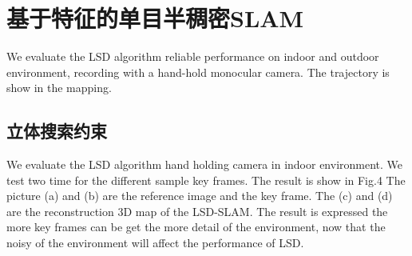 
\chapter{基于特征的单目半稠密SLAM}
\label{chap:Semi-Dense}
We evaluate the LSD algorithm reliable performance on indoor and outdoor environment, recording with a hand-hold monocular camera. The trajectory is show in the mapping.

\section{立体搜索约束}
We evaluate the LSD algorithm hand holding camera in indoor environment. We test two time for the different sample key frames. The result is show in Fig.4 The picture (a) and (b) are the reference image and the key frame. The (c) and (d) are the reconstruction 3D map of the LSD-SLAM. The result is expressed the more key frames can be get the more detail of the environment, now that the noisy of the environment will affect the performance of LSD.

